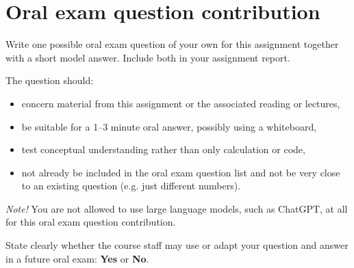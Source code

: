 \section{Oral exam question contribution}

Write one possible oral exam question of your own for this assignment together with a short model answer. Include both in your assignment report.

The question should:
\begin{itemize}
\item concern material from this assignment or the associated reading or lectures,
\item be suitable for a 1--3 minute oral answer, possibly using a whiteboard,
\item test conceptual understanding rather than only calculation or code,
\item not already be included in the oral exam question list and not be very close to an existing question (e.g. just different numbers).
\end{itemize}

\emph{Note!} You are not allowed to use large language models, such as ChatGPT, at all for this oral exam question contribution.

State clearly whether the course staff may use or adapt your question and answer in a future oral exam: \textbf{Yes} or \textbf{No}.

